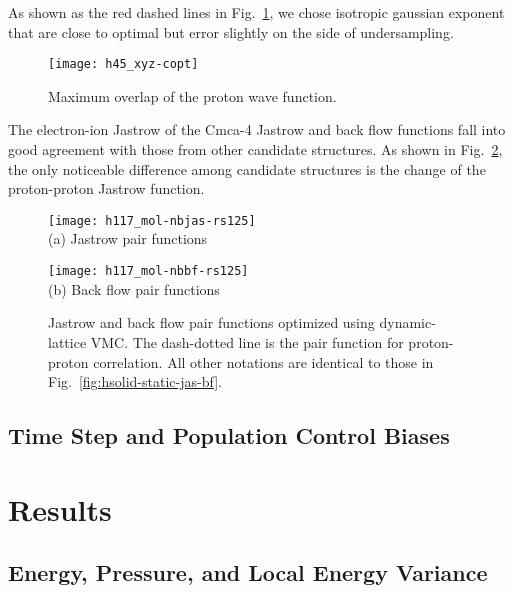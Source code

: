 As shown as the red dashed lines in Fig.~\ref{fig:prot-cp-opt}, we chose isotropic gaussian exponent that are close to optimal but error slightly on the side of undersampling.

\begin{figure}[h]
\centering
\texttt{[image: h45\_xyz-copt]}
\caption{Maximum overlap of the proton wave function.}
\label{fig:prot-cp-opt}
\end{figure}

The electron-ion Jastrow of the Cmca-4 Jastrow and back flow functions fall into good agreement with those from other candidate structures. As shown in Fig.~\ref{fig:hsolid-dynamic-jas-bf}, the only noticeable difference among candidate structures is the change of the proton-proton Jastrow function.

\begin{figure}[h]
\centering
\begin{minipage}{0.49\textwidth}
\centering
\texttt{[image: h117\_mol-nbjas-rs125]}\\
(a) Jastrow pair functions
\end{minipage}
\begin{minipage}{0.49\textwidth}
\centering
\texttt{[image: h117\_mol-nbbf-rs125]}\\
(b) Back flow pair functions
\end{minipage}
\caption{Jastrow and back flow pair functions optimized using dynamic-lattice VMC. The dash-dotted line is the pair function for proton-proton correlation. All other notations are identical to those in Fig.~\ref{fig:hsolid-static-jas-bf}.}
\label{fig:hsolid-dynamic-jas-bf}
\end{figure}

\subsection{Time Step and Population Control Biases}

\section{Results}
\label{sec:hsolid-results}

\subsection{Energy, Pressure, and Local Energy Variance}

